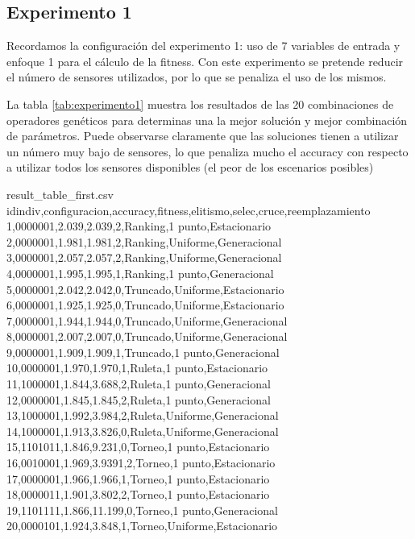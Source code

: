 \subsection{Experimento 1}

Recordamos la configuración del experimento 1: uso de 7 variables de entrada y enfoque 1 para el cálculo de la fitness. Con este experimento se pretende reducir el número de sensores utilizados, por lo que se penaliza el uso de los mismos.

La tabla \ref{tab:experimento1} muestra los resultados de las 20 combinaciones de operadores genéticos para determinas una la mejor solución y mejor combinación de parámetros. Puede observarse claramente que las soluciones tienen a utilizar un número muy bajo de sensores, lo que penaliza mucho el accuracy con respecto a utilizar todos los sensores disponibles (el peor de los escenarios posibles)


\begin{filecontents*}{result_table_first.csv}
idindiv,configuracion,accuracy,fitness,elitismo,selec,cruce,reemplazamiento
1,0000001,2.039,2.039,2,Ranking,1 punto,Estacionario
2,0000001,1.981,1.981,2,Ranking,Uniforme,Generacional
3,0000001,2.057,2.057,2,Ranking,Uniforme,Generacional
4,0000001,1.995,1.995,1,Ranking,1 punto,Generacional
5,0000001,2.042,2.042,0,Truncado,Uniforme,Estacionario
6,0000001,1.925,1.925,0,Truncado,Uniforme,Estacionario
7,0000001,1.944,1.944,0,Truncado,Uniforme,Generacional
8,0000001,2.007,2.007,0,Truncado,Uniforme,Generacional
9,0000001,1.909,1.909,1,Truncado,1 punto,Generacional
10,0000001,1.970,1.970,1,Ruleta,1 punto,Estacionario
11,1000001,1.844,3.688,2,Ruleta,1 punto,Generacional
12,0000001,1.845,1.845,2,Ruleta,1 punto,Generacional
13,1000001,1.992,3.984,2,Ruleta,Uniforme,Generacional
14,1000001,1.913,3.826,0,Ruleta,Uniforme,Generacional
15,1101011,1.846,9.231,0,Torneo,1 punto,Estacionario
16,0010001,1.969,3.9391,2,Torneo,1 punto,Estacionario
17,0000001,1.966,1.966,1,Torneo,1 punto,Estacionario
18,0000011,1.901,3.802,2,Torneo,1 punto,Estacionario
19,1101111,1.866,11.199,0,Torneo,1 punto,Generacional
20,0000101,1.924,3.848,1,Torneo,Uniforme,Estacionario
\end{filecontents*}



